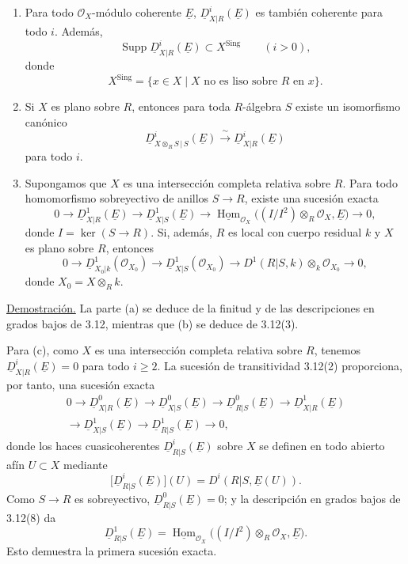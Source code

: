 \begin{enumerate}[label=(\alph*)]
\item Para todo $\mathcal O_X$-módulo coherente $\underline E$,
$\underline D^i_{X|R}(\underline E)$ es también coherente para todo
$i$. Además,
\[
 \operatorname{Supp}\underline D^i_{X|R}(\underline E)
 \subset X^{\mathrm{Sing}}
 \qquad(i>0),
\]
donde
\[
 X^{\mathrm{Sing}}
 =\{x\in X\mid X\text{ no es liso sobre }R\text{ en }x\}.
\]

\item Si $X$ es plano sobre $R$, entonces para toda $R$-álgebra $S$
existe un isomorfismo canónico
\[
 \underline D^i_{X\otimes_RS\,|\,S}(\underline E)
 \xrightarrow{\ \sim\ }
 \underline D^i_{X|R}(\underline E)
\]
para todo $i$.

\item Supongamos que $X$ es una intersección completa relativa sobre
$R$. Para todo homomorfismo sobreyectivo de anillos
$S\longrightarrow R$, existe una sucesión exacta
\[
0\longrightarrow\underline D^1_{X|R}(\underline E)
\longrightarrow\underline D^1_{X|S}(\underline E)
\longrightarrow
\underline{\operatorname{Hom}}_{\mathcal O_X}
 \bigl((I/I^2)\otimes_R\mathcal O_X,\underline E\bigr)
\longrightarrow0,
\]
donde $I=\ker(S\longrightarrow R)$. Si, además, $R$ es local
con cuerpo residual $k$ y $X$ es plano sobre $R$, entonces
\[
0\longrightarrow
 \underline D^1_{X_0|k}(\mathcal O_{X_0})
\longrightarrow
 \underline D^1_{X|S}(\mathcal O_{X_0})
\longrightarrow
 D^1(R|S,k)\otimes_k\mathcal O_{X_0}
\longrightarrow0,
\]
donde $X_0=X\otimes_Rk$.
\end{enumerate}

\underline{Demostración.}
La parte (a) se deduce de la finitud y de las descripciones en grados
bajos de 3.12, mientras que (b) se deduce de 3.12(3).

Para (c), como $X$ es una intersección completa relativa sobre $R$,
tenemos $\underline D^i_{X|R}(\underline E)=0$ para todo $i\geq2$.
La sucesión de transitividad 3.12(2) proporciona, por tanto, una
sucesión exacta
\begin{multline*}
0\longrightarrow\underline D^0_{X|R}(\underline E)
\longrightarrow\underline D^0_{X|S}(\underline E)
\longrightarrow\underline D^0_{R|S}(\underline E)
\longrightarrow\underline D^1_{X|R}(\underline E)\\
\longrightarrow\underline D^1_{X|S}(\underline E)
\longrightarrow\underline D^1_{R|S}(\underline E)
\longrightarrow0,
\end{multline*}
donde los haces cuasicoherentes
$\underline D^i_{R|S}(\underline E)$ sobre $X$ se definen en todo
abierto afín $U\subset X$ mediante
\[
 \bigl[\underline D^i_{R|S}(\underline E)\bigr](U)
 =D^i(R|S,\underline E(U)).
\]
Como $S\longrightarrow R$ es sobreyectivo,
$\underline D^0_{R|S}(\underline E)=0$; y la descripción en grados
bajos de 3.12(8) da
\[
 \underline D^1_{R|S}(\underline E)
 =\underline{\operatorname{Hom}}_{\mathcal O_X}
  \bigl((I/I^2)\otimes_R\mathcal O_X,\underline E\bigr).
\]
Esto demuestra la primera sucesión exacta.

